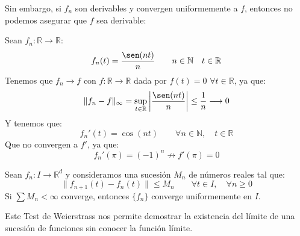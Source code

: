 Sin embargo, si $f_n$ son derivables y convergen uniformemente a $f$, entonces no podemos asegurar que $f$ sea derivable:
\begin{ejemplo}
    Sean $f_n:\mathbb{R}\rightarrow\mathbb{R}$:
    \begin{equation*}
        f_n(t) = \dfrac{\sen(nt)}{n} \qquad n\in \mathbb{N} \quad t\in \mathbb{R}
    \end{equation*}
    Tenemos que $f_n\rightarrow f$ con $f:\mathbb{R}\rightarrow\mathbb{R}$ dada por $f(t) = 0$ $\forall t\in \mathbb{R}$, ya que:
    \begin{equation*}
        \|f_n - f\|_\infty = \sup_{t\in \mathbb{R}} \left|\dfrac{\sen(nt)}{n}\right| \leq \dfrac{1}{n} \longrightarrow 0
    \end{equation*}
    Y tenemos que:
    \begin{equation*}
        f_n'(t) = \cos(nt) \qquad \forall n\in \mathbb{N}, \quad t\in \mathbb{R}
    \end{equation*}
    Que no convergen a $f'$, ya que:
    \begin{equation*}
        f_n'(\pi) = {(-1)}^{n} \not\rightarrow f'(\pi) = 0
    \end{equation*}
\end{ejemplo}

\begin{prop}
    Sean $f_n:I\rightarrow\mathbb{R}^d$ y consideramos una sucesión $M_n$ de números reales tal que:
    \begin{equation*}
        \|f_{n+1}(t) - f_n(t)\| \leq M_n \qquad \forall t\in I, \quad \forall n\geq 0
    \end{equation*}
    Si $\sum M_n < \infty$ converge, entonces $\{f_n\}$ converge uniformemente en $I$.
\end{prop}
Este Test de Weierstrass nos permite demostrar la existencia del límite de una sucesión de funciones sin conocer la función límite.

